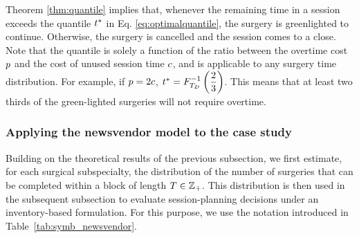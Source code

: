 Theorem \ref{thm:quantile} implies that, whenever the remaining time in a session exceeds the quantile $t^{*}$ in Eq. \eqref{eq:optimalquantile}, the surgery is greenlighted to continue. Otherwise, the surgery is cancelled and the session comes to a close. Note that the quantile is solely a function of the ratio between the overtime cost $p$ and the cost of unused session time $c$, and is applicable to any surgery time distribution. For example, if $p = 2c$, $t^{*} = F^{-1}_{T_D} \left( \dfrac{2}{3} \right)$. This means that at least two thirds of the green-lighted surgeries will not require overtime.

\subsubsection{Applying the newsvendor model to the case study\label{sec:applicationnewsvendor}}
Building on the theoretical results of the previous subsection, we first estimate, for each surgical subspecialty, the distribution of the number of surgeries that can be completed within a block of length $T \in \mathbb{Z}_{+}$. 
This distribution is then used in the subsequent subsection to evaluate session-planning decisions under an inventory-based formulation.
For this purpose, we use the notation introduced in Table~\ref{tab:symb_newsvendor}. 


